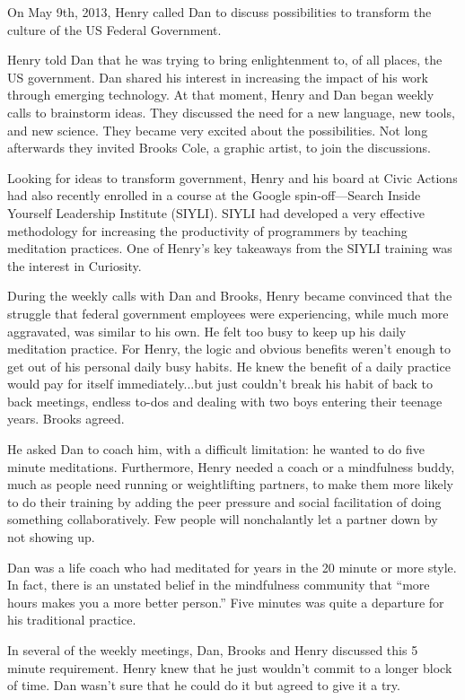 \documentclass[12pt]{book}
\begin{document}
On May 9th, 2013, Henry called Dan to discuss possibilities to transform the culture of the US Federal Government.
					
Henry told Dan that he was trying to bring enlightenment to, of all places, the US government. Dan shared his interest in increasing the impact of his work through emerging technology. At that moment, Henry and Dan began weekly calls to brainstorm ideas. They discussed the need for a new language, new tools, and new science. They became very excited about the possibilities. Not long afterwards they invited Brooks Cole, a graphic artist, to join the discussions.
					
Looking for ideas to transform government, Henry and his board at Civic Actions had also recently enrolled in a course at the Google spin-off---Search Inside Yourself Leadership Institute (SIYLI). SIYLI had developed a very effective methodology for increasing the productivity of programmers by teaching meditation practices. One of Henry’s key takeaways from the SIYLI training was the interest in Curiosity.
					
During the weekly calls with Dan and Brooks, Henry became convinced that the struggle that federal government employees were experiencing, while much more aggravated, was similar to his own. He felt too busy to keep up his daily meditation practice. For Henry, the logic and obvious benefits weren't enough to get out of his personal daily busy habits. He knew the benefit of a daily practice would pay for itself immediately...but just couldn't break his habit of back to back meetings, endless to-dos and dealing with two boys entering their teenage years. Brooks agreed.
					
He asked Dan to coach him, with a difficult limitation: he wanted to do five minute meditations. Furthermore, Henry needed a coach or a mindfulness buddy, much as people need running or weightlifting partners, to make them more likely to do their training by adding the peer pressure and social facilitation of doing something collaboratively. Few people will nonchalantly let a partner down by not showing up.
					
Dan was a life coach who had meditated for years in the 20 minute or more style. In fact, there is an unstated belief in the mindfulness community that “more hours makes you a more better person.” Five minutes was quite a departure for his traditional practice.
					
In several of the weekly meetings, Dan, Brooks and Henry discussed this 5 minute requirement. Henry knew that he just wouldn't commit to a longer block of time. Dan wasn't sure that he could do it but agreed to give it a try.
					
\end{document}
